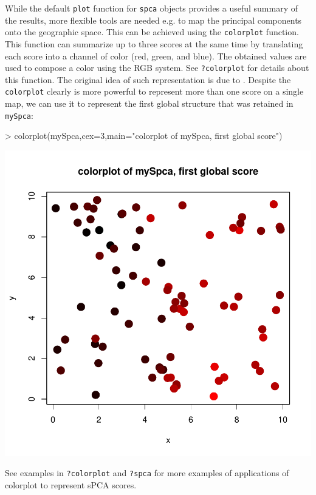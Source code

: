 \documentclass{article}
\begin{document}
While the default \texttt{plot} function for \texttt{spca} objects provides a useful summary of the
results, more flexible tools are needed e.g. to map the principal components onto the geographic space.
This can be achieved using the
\texttt{colorplot} function.
This function can summarize up to three scores at the same time by
translating each score into a channel of color (red, green, and blue).
The obtained values are used to compose a color using the RGB system.
See \texttt{?colorplot} for details about this function.
The original idea of such representation is due to \cite{tj179}.
Despite the \texttt{colorplot} clearly is more powerful to represent
more than one score on a single map, we can use it to represent the
first global structure that was retained in \texttt{mySpca}:
\begin{Schunk}
\begin{Sinput}
> colorplot(mySpca,cex=3,main="colorplot of mySpca, first global score")
\end{Sinput}
\end{Schunk}
\includegraphics{spca-colorplot}

\noindent See examples in \texttt{?colorplot} and \texttt{?spca}
for more examples of applications of colorplot to represent sPCA scores.
\\
\end{document}
